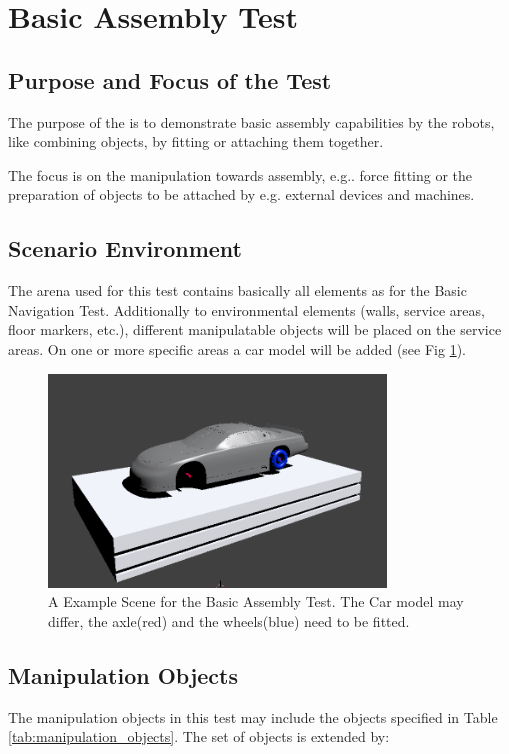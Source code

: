 \newpage
\section{Basic Assembly Test}

\subsection{Purpose and Focus of the Test}
The purpose of the  is to demonstrate basic assembly capabilities by the robots, like combining objects, by fitting or attaching them together.
\par
The focus is on the manipulation towards assembly, e.g.. force fitting or the preparation of objects to be attached by e.g. external devices and machines.

\subsection{Scenario Environment}
The arena used for this test contains basically all elements as for the Basic Navigation Test. Additionally to environmental elements (walls, service areas, floor markers, etc.), different manipulatable objects will be placed on the service areas. On one or more specific areas a car model will be added (see Fig \ref{fig:BAT_car}).

\begin{figure} [h!]
\centering
\includegraphics[width=0.8\textwidth ]{./images/BAT.png}
\caption{A Example Scene for the Basic Assembly Test. The Car model may differ, the axle(red) and the wheels(blue) need to be fitted.}
\label{fig:BAT_car}
\end{figure}


\subsection{Manipulation Objects}
The manipulation objects in this test may include the objects specified in Table \ref{tab:manipulation_objects}. The set of objects is extended by:

